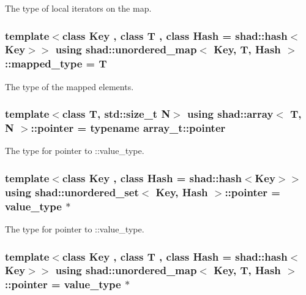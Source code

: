 The type of local iterators on the map. 

\hypertarget{group__Types_ga146f53b5d4191c21deed1bd89683d4bf}{
\subsubsection[{mapped\-\_\-type}]{\setlength{\rightskip}{0pt plus 5cm}template$<$class Key , class T , class Hash  = shad\-::hash$<$\-Key$>$$>$ using {\bf shad\-::unordered\-\_\-map}$<$ Key, T, Hash $>$\-::mapped\-\_\-type =  T}}\label{group__Types_ga146f53b5d4191c21deed1bd89683d4bf}


The type of the mapped elements. 

\hypertarget{group__Types_gadfa9e253e7692c86d9fa4386cebf9459}{
\subsubsection[{pointer}]{\setlength{\rightskip}{0pt plus 5cm}template$<$class T, std\-::size\-\_\-t N$>$ using {\bf shad\-::array}$<$ T, N $>$\-::pointer =  typename array\-\_\-t\-::pointer}}\label{group__Types_gadfa9e253e7692c86d9fa4386cebf9459}


The type for pointer to \-::value\-\_\-type. 

\hypertarget{group__Types_ga84503e3a7375cd54f32da739fe21ecc9}{
\subsubsection[{pointer}]{\setlength{\rightskip}{0pt plus 5cm}template$<$class Key , class Hash  = shad\-::hash$<$\-Key$>$$>$ using {\bf shad\-::unordered\-\_\-set}$<$ Key, Hash $>$\-::pointer =  value\-\_\-type $\ast$}}\label{group__Types_ga84503e3a7375cd54f32da739fe21ecc9}


The type for pointer to \-::value\-\_\-type. 

\hypertarget{group__Types_ga94466a187a2da262cb5b58356c3ac24c}{
\subsubsection[{pointer}]{\setlength{\rightskip}{0pt plus 5cm}template$<$class Key , class T , class Hash  = shad\-::hash$<$\-Key$>$$>$ using {\bf shad\-::unordered\-\_\-map}$<$ Key, T, Hash $>$\-::pointer =  value\-\_\-type $\ast$}}\label{group__Types_ga94466a187a2da262cb5b58356c3ac24c}



